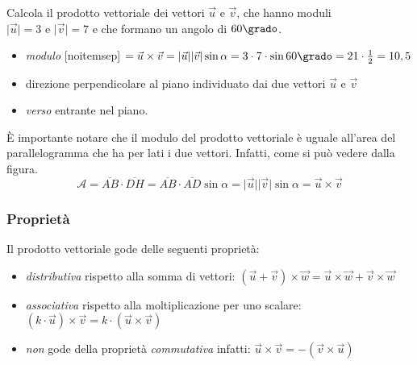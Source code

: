  \begin{esempio}
  Calcola il prodotto vettoriale dei  vettori $\vec{u}$ e $\vec{v}$, 
  che hanno moduli $\lvert\vec{u}\rvert= 3 \text{ e } \lvert\vec{v}\rvert=7$ 
  e che formano un angolo di $60\grado$. 
 \begin{itemize}
  \item \emph{modulo}  [noitemsep] 
  \(= \vec{u} \times \vec{v} = 
    \lvert\vec{u}\rvert\lvert\vec{v}\rvert \sin \alpha=
    3 \cdot 7 \cdot \sin 60\grado = 21 \cdot \frac{1}{2} = 10,5\)
  \item direzione perpendicolare al piano individuato dai due 
   vettori $\vec{u}$ e $\vec{v}$
  \item \emph{verso} entrante nel piano.
 \end{itemize}
 \end{esempio}

\osservazione
\mbox{}

\begin{minipage}{.59 \textwidth}
È importante notare  che il modulo del prodotto vettoriale è uguale all'area 
del parallelogramma che ha per lati i due vettori.
Infatti, come si può vedere dalla figura.%
\[\mathcal{A} = \overline{AB} \cdot \overline{DH} =
            \overline{AB} \cdot \overline{AD} \sin \alpha =
            \lvert\vec{u}\rvert\lvert\vec{v}\rvert \sin \alpha=
            \vec{u} \times \vec{v}\]
\end{minipage}
\hfill
\begin{minipage}{.39 \textwidth}
\begin{center}
\begin{inaccessibleblock}
  
\end{inaccessibleblock}
\end{center}
\end{minipage}
     

\subsubsection{Proprietà}

Il prodotto vettoriale gode delle seguenti proprietà:
\begin{itemize} [noitemsep]
 \item \emph{distributiva} rispetto alla somma di vettori: \hfill
  \(\displaystyle\left(\vec{u} + \vec{v} \right) \times \vec{w} = 
    \vec{u} \times \vec{w} + \vec{v} \times \vec{w}\)
 \item \emph{associativa} rispetto alla moltiplicazione
  per uno scalare: \hfill
  \(\displaystyle\left(k \cdot \vec{u} \right) \times \vec{v} = 
    k \cdot \left(\vec{u} \times \vec{v} \right)\)
 \item \emph{non} gode della proprietà \emph{commutativa} infatti: \hfill
  \(\displaystyle\vec{u} \times \vec{v} = 
  - \left(\vec{v} \times \vec{u}\right)\)
\end{itemize}

